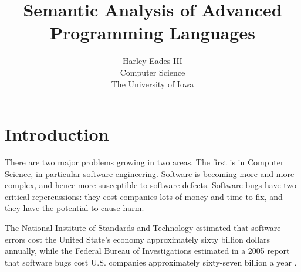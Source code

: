 \usepackage{amsmath,amssymb,amsthm,amstext}
\usepackage{mathpartir}
\usepackage{vmargin}
\usepackage{enumitem}
\usepackage{url}
\usepackage{todonotes}
\usepackage{listings}
\usepackage{stmaryrd} 
\usepackage{graphicx}
\usepackage{tikz}
\usepackage{hyperref}
\usetikzlibrary{arrows}
\usetikzlibrary{shapes}

\newtheorem{theorem}{Theorem}
\newtheorem{lemma}[theorem]{Lemma}
\newtheorem{corollary}[theorem]{Corollary}
\newtheorem{definition}[theorem]{Definition}
\newtheorem{proposition}[theorem]{Proposition}
\newtheorem{example}[theorem]{Example}

\newcommand{\redto}[0]{\rightsquigarrow}
\newcommand{\interp}[1]{\llbracket #1 \rrbracket}
\newcommand{\ifrName}[1]{#1}
\newcommand{\Sep}[0]{\text{SepPP}}

\newcommand{\chcalc}[0]{\bar{\lambda}\mu\tilde{\mu}}

\newcommand{\cse}[0]{\noindent\underline{\textbf{Case:}}\ }


\newcommand{\ndto}[1]{\to_{#1}}
\newcommand{\ndwedge}[1]{\wedge_{#1}}

\newcommand{\To}[0]{\Rightarrow}



\title{Semantic Analysis of Advanced Programming Languages}

\author{Harley Eades III\\ Computer Science\\ The University of Iowa}

\date{}

\maketitle

\section{Introduction}
\label{sec:introduction}
There are two major problems growing in two areas.  The first is in
Computer Science, in particular software engineering. Software is
becoming more and more complex, and hence more susceptible to software
defects.  Software bugs have two critical repercussions: they cost
companies lots of money and time to fix, and they have the potential
to cause harm. 

The National Institute of Standards and Technology estimated that
software errors cost the United State's economy approximately sixty
billion dollars annually, while the Federal Bureau of Investigations
estimated in a 2005 report that software bugs cost U.S. companies
approximately sixty-seven billion a year \cite{nist02,fbi05}.

